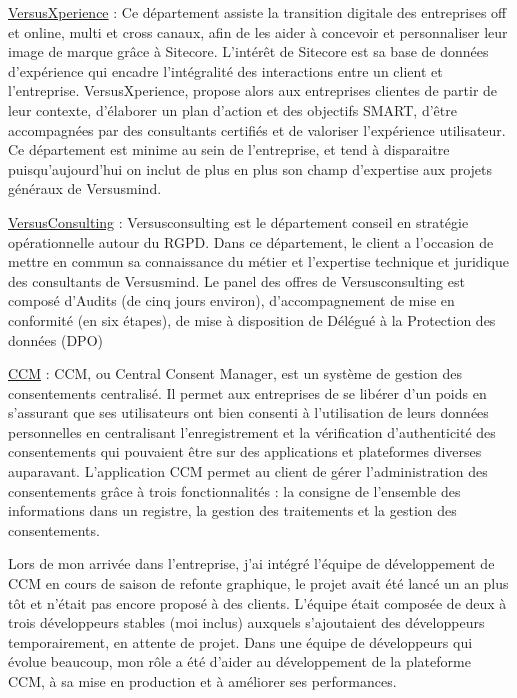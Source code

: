 \documentclass[12pt, a4paper]{report}
\begin{document}
\underline{VersusXperience} : Ce département assiste la transition digitale des entreprises off et online, multi et
cross canaux, afin de les aider à concevoir et personnaliser leur image de marque grâce à Sitecore.
L’intérêt de Sitecore est sa base de données d’expérience qui encadre l’intégralité des interactions
entre un client et l’entreprise. VersusXperience, propose alors aux entreprises clientes de partir de leur
contexte, d’élaborer un plan d’action et des objectifs SMART, d’être accompagnées par des consultants
certifiés et de valoriser l’expérience utilisateur. Ce département est minime au sein de l’entreprise, et
tend à disparaitre puisqu’aujourd’hui on inclut de plus en plus son champ d’expertise aux projets
généraux de Versusmind.\newline

\underline{VersusConsulting} : Versusconsulting est le département conseil en stratégie opérationnelle autour du
RGPD. Dans ce département, le client a l’occasion de mettre en commun sa connaissance du métier et
l’expertise technique et juridique des consultants de Versusmind. Le panel des offres de
Versusconsulting est composé d’Audits (de cinq jours environ), d’accompagnement de mise en
conformité (en six étapes), de mise à disposition de Délégué à la Protection des données (DPO)\newline

\underline{CCM} : CCM, ou Central Consent Manager, est un système de gestion des consentements centralisé. Il
permet aux entreprises de se libérer d’un poids en s’assurant que ses utilisateurs ont bien consenti à
l’utilisation de leurs données personnelles en centralisant l’enregistrement et la vérification
d’authenticité des consentements qui pouvaient être sur des applications et plateformes diverses
auparavant. L’application CCM permet au client de gérer l’administration des consentements grâce à
trois fonctionnalités : la consigne de l’ensemble des informations dans un registre, la gestion des
traitements et la gestion des consentements.\newline

Lors de mon arrivée dans l’entreprise, j’ai intégré l’équipe de développement de CCM en cours de
saison de refonte graphique, le projet avait été lancé un an plus tôt et n’était pas encore proposé à des
clients. L’équipe était composée de deux à trois développeurs stables (moi inclus) auxquels s’ajoutaient
des développeurs temporairement, en attente de projet.
Dans une équipe de développeurs qui évolue beaucoup, mon rôle a été d'aider au développement de la plateforme CCM, à sa mise en production et à améliorer ses performances.
\end{document}
